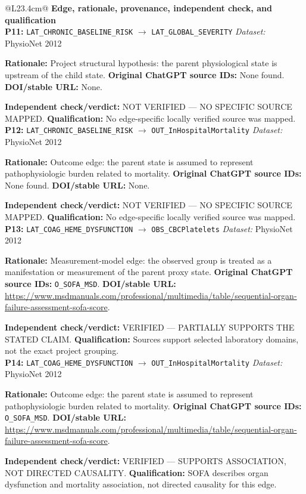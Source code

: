 \begin{tabular}{@{}L{23.4cm}@{}}
\toprule
\textbf{Edge, rationale, provenance, independent check, and qualification}\\
\midrule
\textbf{P11:} \nolinkurl{LAT_CHRONIC_BASELINE_RISK} $\rightarrow$ \nolinkurl{LAT_GLOBAL_SEVERITY} \hfill \textit{Dataset:} PhysioNet 2012\par\textbf{Rationale:} Project structural hypothesis: the parent physiological state is upstream of the child state. \textbf{Original ChatGPT source IDs:} None found. \textbf{DOI/stable URL:} None.\par\textbf{Independent check/verdict:} NOT VERIFIED --- NO SPECIFIC SOURCE MAPPED. \textbf{Qualification:} No edge-specific locally verified source was mapped. \\
\addlinespace[2pt]
\midrule
\textbf{P12:} \nolinkurl{LAT_CHRONIC_BASELINE_RISK} $\rightarrow$ \nolinkurl{OUT_InHospitalMortality} \hfill \textit{Dataset:} PhysioNet 2012\par\textbf{Rationale:} Outcome edge: the parent state is assumed to represent pathophysiologic burden related to mortality. \textbf{Original ChatGPT source IDs:} None found. \textbf{DOI/stable URL:} None.\par\textbf{Independent check/verdict:} NOT VERIFIED --- NO SPECIFIC SOURCE MAPPED. \textbf{Qualification:} No edge-specific locally verified source was mapped. \\
\addlinespace[2pt]
\midrule
\textbf{P13:} \nolinkurl{LAT_COAG_HEME_DYSFUNCTION} $\rightarrow$ \nolinkurl{OBS_CBCPlatelets} \hfill \textit{Dataset:} PhysioNet 2012\par\textbf{Rationale:} Measurement-model edge: the observed group is treated as a manifestation or measurement of the parent proxy state. \textbf{Original ChatGPT source IDs:} \nolinkurl{O_SOFA_MSD}. \textbf{DOI/stable URL:} \url{https://www.msdmanuals.com/professional/multimedia/table/sequential-organ-failure-assessment-sofa-score}.\par\textbf{Independent check/verdict:} VERIFIED --- PARTIALLY SUPPORTS THE STATED CLAIM. \textbf{Qualification:} Sources support selected laboratory domains, not the exact project grouping. \\
\addlinespace[2pt]
\midrule
\textbf{P14:} \nolinkurl{LAT_COAG_HEME_DYSFUNCTION} $\rightarrow$ \nolinkurl{OUT_InHospitalMortality} \hfill \textit{Dataset:} PhysioNet 2012\par\textbf{Rationale:} Outcome edge: the parent state is assumed to represent pathophysiologic burden related to mortality. \textbf{Original ChatGPT source IDs:} \nolinkurl{O_SOFA_MSD}. \textbf{DOI/stable URL:} \url{https://www.msdmanuals.com/professional/multimedia/table/sequential-organ-failure-assessment-sofa-score}.\par\textbf{Independent check/verdict:} VERIFIED --- SUPPORTS ASSOCIATION, NOT DIRECTED CAUSALITY. \textbf{Qualification:} SOFA describes organ dysfunction and mortality association, not directed causality for this edge. \\

\end{tabular}
